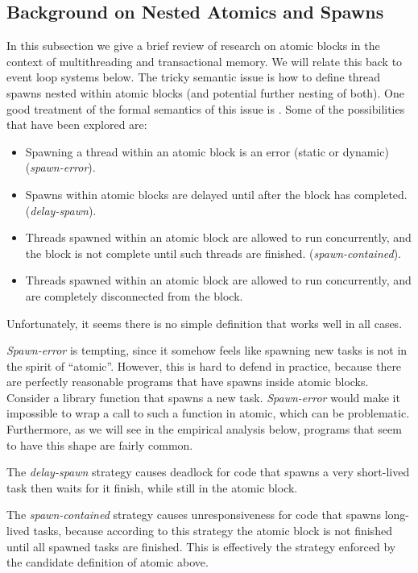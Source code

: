 \documentclass[acmsmall,anonymous,review]{acmart}\settopmatter{printfolios=true,printccs=false,printacmref=false}
\begin{document}
\subsection{Background on Nested Atomics and Spawns}

In this subsection we give a brief review of research on atomic blocks in the context of multithreading and transactional memory.
We will relate this back to event loop systems below.
The tricky semantic issue is how to define thread spawns nested within atomic blocks (and potential further nesting of both).
One good treatment of the formal semantics of this issue is \cite{Moore2008}.
Some of the possibilities that have been explored are:
\begin{itemize}
\item Spawning a thread within an atomic block is an error (static or dynamic) (\emph{spawn-error}).
\item Spawns within atomic blocks are delayed until after the block has completed. (\emph{delay-spawn}).
\item Threads spawned within an atomic block are allowed to run concurrently, and the block is not complete until such threads are finished. (\emph{spawn-contained}).
\item Threads spawned within an atomic block are allowed to run concurrently, and are completely disconnected from the block.
\end{itemize}

Unfortunately, it seems there is no simple definition that works well in all cases.

\emph{Spawn-error} is tempting, since it somehow feels like spawning new tasks is not in the spirit of ``atomic''.
However, this is hard to defend in practice, because there are perfectly reasonable programs that have spawns inside atomic blocks.
Consider a library function that spawns a new task.
\emph{Spawn-error} would make it impossible to wrap a call to such a function in atomic, which can be problematic.
Furthermore, as we will see in the empirical analysis below, programs that seem to have this shape are fairly common.

The \emph{delay-spawn} strategy causes deadlock for code that spawns a very short-lived task then waits for it finish, while still in the atomic block.

The \emph{spawn-contained} strategy causes unresponsiveness for code that spawns long-lived tasks, because according to this strategy the atomic block is not finished until all spawned tasks are finished.
This is effectively the strategy enforced by the candidate definition of atomic above.
\end{document}
